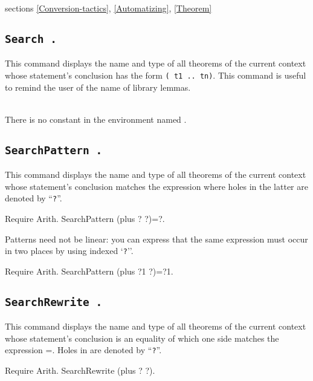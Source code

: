 \SeeAlso sections \ref{Conversion-tactics}, \ref{Automatizing},
\ref{Theorem}

\subsection{\tt Search {\qualid}.}
This command displays the name and type of all theorems of the current
context whose statement's conclusion has the form {\tt ({\qualid} t1 ..
  tn)}.  This command is useful to remind the user of the name of
library lemmas.
\begin{ErrMsgs}
\item {}\\
    There is no constant in the environment named
    \ident.
\end{ErrMsgs}

\subsection{\tt SearchPattern {\term}.}

This command displays the name and type of all theorems of the current
context whose statement's conclusion matches the expression {\term}
where holes in the latter are denoted by ``{\texttt ?}''.

\begin{coq_example}
Require Arith.
SearchPattern (plus ? ?)=?.
\end{coq_example}

Patterns need not be linear: you can express that the same
expression must occur in two places by using indexed `{\texttt ?}''.

\begin{coq_example}
Require Arith.
SearchPattern (plus ?1 ?)=?1.
\end{coq_example}

\subsection{\tt SearchRewrite {\term}.}

This command displays the name and type of all theorems of the current
context whose statement's conclusion is an equality of which one side matches
the expression {\term =}. Holes in {\term} are denoted by ``{\texttt ?}''.

\begin{coq_example}
Require Arith.
SearchRewrite (plus ? ?).
\end{coq_example}

